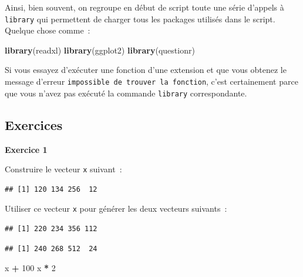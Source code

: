 \documentclass[12pt,]{book}
\newenvironment{Shaded}{\begin{snugshade}}{\end{snugshade}}
\newcommand{\DecValTok}[1]{\textcolor[rgb]{0.06,0.06,0.06}{#1}}
\newcommand{\KeywordTok}[1]{\textcolor[rgb]{0.27,0.27,0.27}{\textbf{#1}}}
\newcommand{\NormalTok}[1]{#1}
\newcommand{\OperatorTok}[1]{\textcolor[rgb]{0.43,0.43,0.43}{\textbf{#1}}}
\newcommand{\StringTok}[1]{\textcolor[rgb]{0.5,0.5,0.5}{#1}}
\begin{document}
Ainsi, bien souvent, on regroupe en début de script toute une série d'appels à \texttt{library} qui permettent de charger tous les packages utilisés dans le script. Quelque chose comme~:

\begin{Shaded}
\begin{Highlighting}[]
\KeywordTok{library}\NormalTok{(readxl)}
\KeywordTok{library}\NormalTok{(ggplot2)}
\KeywordTok{library}\NormalTok{(questionr)}
\end{Highlighting}
\end{Shaded}

Si vous essayez d'exécuter une fonction d'une extension et que vous obtenez le message d'erreur \texttt{impossible\ de\ trouver\ la\ fonction}, c'est certainement parce que vous n'avez pas exécuté la commande \texttt{library} correspondante.

\hypertarget{ex-introR}{%
\subsection{Exercices}\label{ex-introR}}

\textbf{Exercice 1}

Construire le vecteur \texttt{x} suivant~:

\begin{verbatim}
## [1] 120 134 256  12
\end{verbatim}

Utiliser ce vecteur \texttt{x} pour générer les deux vecteurs suivants~:

\begin{verbatim}
## [1] 220 234 356 112
\end{verbatim}

\begin{verbatim}
## [1] 240 268 512  24
\end{verbatim}

\iffalse

\begin{Shaded}
\begin{Highlighting}[]
\NormalTok{x }\OperatorTok{+}\StringTok{ }\DecValTok{100}
\NormalTok{x }\OperatorTok{*}\StringTok{ }\DecValTok{2}
\end{Highlighting}
\end{Shaded}
\end{document}
